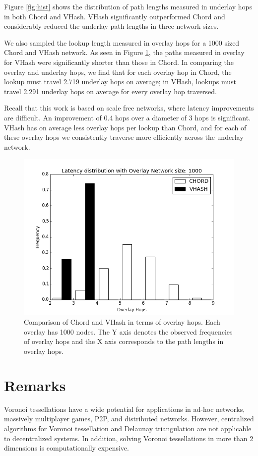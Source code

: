 Figure \ref{fig:hist} shows the distribution of path lengths measured in underlay hops in both Chord and VHash.
VHash significantly outperformed Chord and considerably reduced the underlay path lengths in three network sizes.

We also sampled the lookup length measured in overlay hops for a 1000 sized Chord and VHash network.
As seen in Figure \ref{fig:histover}, the paths measured in overlay for VHash were significantly shorter than those in Chord.
In comparing the overlay and underlay hops, we find that for each overlay hop in Chord, the lookup must travel 2.719 underlay hops on average; in VHash, lookups must travel 2.291 underlay hops on average for every overlay hop traversed.

Recall that this work is based on scale free networks, where latency improvements are difficult.
An improvement of 0.4 hops over a diameter of 3 hops is significant.
VHash has on average less overlay hops per lookup than Chord, and for each of these overlay hops we consistently traverse more efficiently across the underlay network.
\begin{figure}
	\centering
	\includegraphics[width=0.5\linewidth]{figs/hist_overlay_4d}
	\caption[Comparison of Chord and VHash in hops]{Comparison of Chord and VHash in terms of overlay hops.  Each overlay has 1000 nodes.  The Y axis denotes the observed frequencies of overlay hops and the X axis corresponds to the path lengths in overlay hops.}
	\label{fig:histover}
\end{figure}




\section{Remarks}

Voronoi tessellations have a wide potential for applications in ad-hoc networks, massively multiplayer games, P2P, and distributed networks.
However, centralized algorithms for Voronoi tessellation and Delaunay triangulation are not applicable to decentralized systems.
In addition, solving Voronoi tessellations in more than 2 dimensions is computationally expensive.

